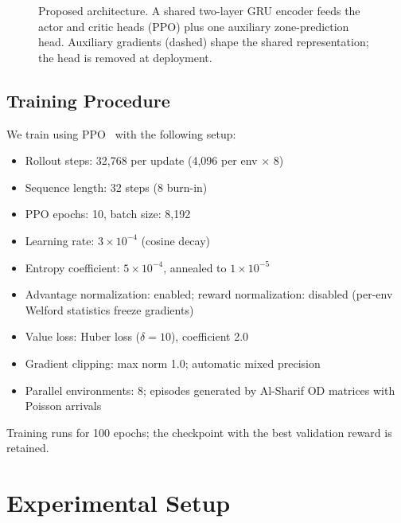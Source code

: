 \documentclass[conference]{IEEEtran}
\begin{document}
\begin{figure}[t]
\centering
{}
\caption{Proposed architecture. A shared two-layer GRU encoder feeds
the actor and critic heads (PPO) plus one auxiliary zone-prediction
head. Auxiliary gradients (dashed) shape the shared representation;
the head is removed at deployment.}
\label{fig:architecture}
\end{figure}

\subsection{Training Procedure}

We train using PPO~\cite{schulman2017ppo} with the following setup:
\begin{itemize}
    \item Rollout steps: 32,768 per update (4,096 per env $\times$ 8)
    \item Sequence length: 32 steps (8 burn-in)
    \item PPO epochs: 10, batch size: 8,192
    \item Learning rate: $3 \times 10^{-4}$ (cosine decay)
    \item Entropy coefficient: $5 \times 10^{-4}$, annealed to
    $1 \times 10^{-5}$
    \item Advantage normalization: enabled; reward normalization:
    disabled (per-env Welford statistics freeze gradients)
    \item Value loss: Huber loss ($\delta=10$), coefficient 2.0
    \item Gradient clipping: max norm 1.0; automatic mixed precision
    \item Parallel environments: 8; episodes generated by
    Al-Sharif OD matrices with Poisson arrivals
\end{itemize}
Training runs for 100 epochs; the checkpoint with the best validation
reward is retained.

\section{Experimental Setup}
\label{sec:experiments}
\end{document}
